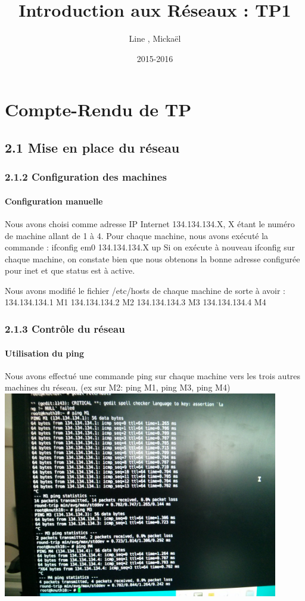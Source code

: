 \documentclass{report}
\title{Introduction aux Réseaux : TP1}
\author{Line \bsc{POUVARET}, Mickaël \bsc{TURNEL}}
\date{2015-2016}
\begin{document}
\maketitle

\chapter*{Compte-Rendu de TP}
\section*{2.1 	Mise en place du réseau}
	\subsection*{2.1.2	Configuration des machines}

\subsubsection*{Configuration manuelle}
Nous avons choisi comme adresse IP Internet 134.134.134.X, X étant le numéro de machine allant de 1 à 4.
Pour chaque machine, nous avons exécuté la commande : ifconfig em0 134.134.134.X up
Si on exécute à nouveau ifconfig sur chaque machine, on constate bien que nous obtenons la bonne adresse configurée pour inet et que status est à active.

Nous avons modifié le fichier /etc/hosts de chaque machine de sorte à avoir :
134.134.134.1 M1
134.134.134.2 M2
134.134.134.3 M3
134.134.134.4 M4

	\subsection*{2.1.3	Contrôle du réseau}

\subsubsection*{Utilisation du ping}
Nous avons effectué une commande ping sur chaque machine vers les trois autres machines du réseau. (ex sur M2: ping M1, ping M3, ping M4)\\
\includegraphics[width=12cm]{screen1.jpg}
\end{document}
